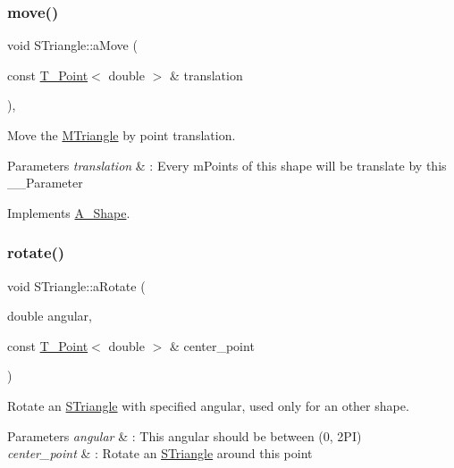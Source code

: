 \subsubsection{\texorpdfstring{move()}{move()}}
{\footnotesize\ttfamily void S\+Triangle\+::aMove (\begin{DoxyParamCaption}\item[{const \hyperlink{classPoint}{T_Point}$<$ double $>$ \&}]{translation }\end{DoxyParamCaption})\hspace{0.3cm}{\ttfamily [override]}, {\ttfamily [virtual]}}



Move the \hyperlink{classMTriangle}{M\+Triangle} by point translation. 


\begin{DoxyParams}{Parameters}
{\em translation} & \+: Every mPoints of this shape will be translate by this __Parameter \\
\hline
\end{DoxyParams}


Implements \hyperlink{classShape_a1f447acd6219cb10b9b7a40371519c46}{A_Shape}.

\mbox{\label{classSTriangle_a53b7f48c2bc66402170912686e77ec5d}} 
\subsubsection{\texorpdfstring{rotate()}{Rotate()}}
{\footnotesize\ttfamily void S\+Triangle\+::aRotate (\begin{DoxyParamCaption}\item[{double}]{angular,  }\item[{const \hyperlink{classPoint}{T_Point}$<$ double $>$ \&}]{center\+\_\+point }\end{DoxyParamCaption})}



Rotate an \hyperlink{classSTriangle}{S\+Triangle} with specified angular, used only for an other shape. 


\begin{DoxyParams}{Parameters}
{\em angular} & \+: This angular should be between (0, 2\+PI) \\
\hline
{\em center\+\_\+point} & \+: Rotate an \hyperlink{classSTriangle}{S\+Triangle} around this point \\
\hline
\end{DoxyParams}
\mbox{\label{classSTriangle_acab6926951bd8f2558e4c658610c0e51}} 
